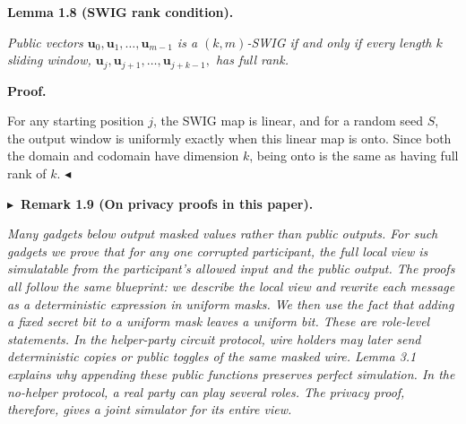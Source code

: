 \documentclass[10pt,a4paper]{article}
\begin{document}


\par\medskip\noindent\textbf{
\textbf{Lemma 1.8}\textbf{ }(SWIG rank condition)\textbf{.}
}\par



\emph{Public vectors $\mathbf{u}_{0},\mathbf{u}_{1},\ldots,\mathbf{u}_{m-1}$ is a
$(k,m)$-SWIG if and only if every length $k$ sliding window,
$\mathbf{u}_{j},\mathbf{u}_{j+1},\ldots,\mathbf{u}_{j+k-1},$
has full rank.}\par






\par\medskip\noindent\textbf{Proof.}\par




For any starting position $j$, the SWIG map is linear, and for a random seed $S$, the output window is uniformly exactly when this linear map is onto. Since both the domain and
codomain have dimension $k$, being onto is the same as having full rank of $k$.
$\blacktriangleleft$\par





\par\medskip\noindent\textbf{
$\blacktriangleright$ Remark 1.9 (On privacy proofs in this paper).
}\par



\emph{Many gadgets below output masked values rather than public outputs. For such gadgets we prove that for any one corrupted participant, the full local view is simulatable from the participant’s allowed input and the public output. The proofs all follow the same blueprint: we describe the local view and rewrite each message as a deterministic expression in uniform masks. We then use the fact that adding a fixed secret bit to a uniform mask leaves a uniform bit. These are role-level statements. In the helper-party circuit protocol, wire holders may later send deterministic copies or public toggles of the same masked wire. Lemma 3.1 explains why appending these public functions preserves perfect simulation. In the no-helper protocol, a real party can play several roles. The privacy proof, therefore, gives a joint simulator for its entire view.}\par
\end{document}
